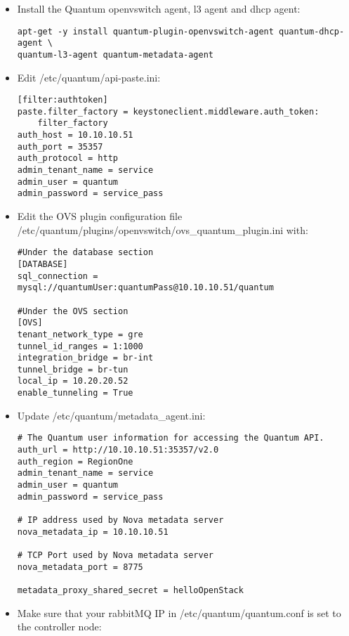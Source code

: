 \begin{itemize}
\item Install the Quantum openvswitch agent, l3 agent and dhcp agent:

\begin{verbatim}
apt-get -y install quantum-plugin-openvswitch-agent quantum-dhcp-agent \
quantum-l3-agent quantum-metadata-agent
\end{verbatim}


\item Edit \slash etc\slash quantum\slash api-paste.ini:

\begin{verbatim}
[filter:authtoken]
paste.filter_factory = keystoneclient.middleware.auth_token:
    filter_factory
auth_host = 10.10.10.51
auth_port = 35357
auth_protocol = http
admin_tenant_name = service
admin_user = quantum
admin_password = service_pass
\end{verbatim}


\item Edit the OVS plugin configuration file \slash etc\slash quantum\slash plugins\slash openvswitch\slash ovs\_quantum\_plugin.ini with:

\begin{verbatim}
#Under the database section
[DATABASE]
sql_connection = mysql://quantumUser:quantumPass@10.10.10.51/quantum

#Under the OVS section
[OVS]
tenant_network_type = gre
tunnel_id_ranges = 1:1000
integration_bridge = br-int
tunnel_bridge = br-tun
local_ip = 10.20.20.52
enable_tunneling = True
\end{verbatim}


\item Update \slash etc\slash quantum\slash metadata\_agent.ini:

\begin{verbatim}
# The Quantum user information for accessing the Quantum API.
auth_url = http://10.10.10.51:35357/v2.0
auth_region = RegionOne
admin_tenant_name = service
admin_user = quantum
admin_password = service_pass

# IP address used by Nova metadata server
nova_metadata_ip = 10.10.10.51

# TCP Port used by Nova metadata server
nova_metadata_port = 8775

metadata_proxy_shared_secret = helloOpenStack
\end{verbatim}


\item Make sure that your rabbitMQ IP in \slash etc\slash quantum\slash quantum.conf is set to the controller node:


\end{itemize}
